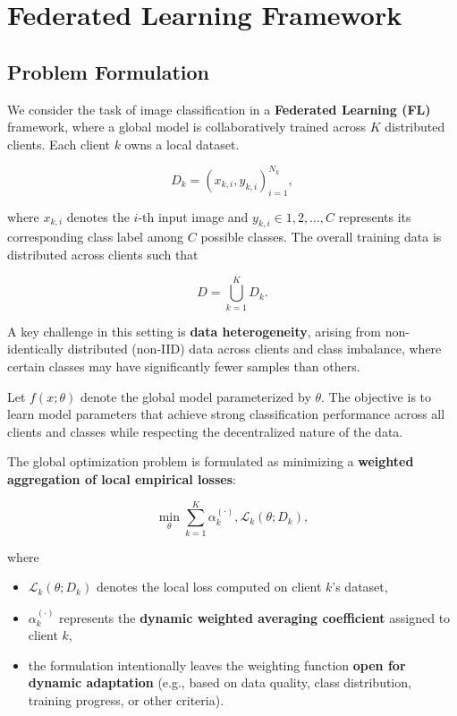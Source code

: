 \documentclass[12pt]{book}
\begin{document}
\chapter{Federated Learning Framework}

\section{Problem Formulation}

We consider the task of image classification in a \textbf{Federated Learning (FL)} framework, where a global model is collaboratively trained across $K$ distributed clients. Each client $k$ owns a local dataset.

\begin{equation}
D_k = {(x_{k,i}, y_{k,i})}_{i=1}^{N_k},
\end{equation}

where $x_{k,i}$ denotes the $i$-th input image and $y_{k,i} \in {1,2,\ldots,C}$ represents its corresponding class label among $C$ possible classes. The overall training data is distributed across clients such that

\begin{equation}
D = \bigcup_{k=1}^{K} D_k .
\end{equation}

A key challenge in this setting is \textbf{data heterogeneity}, arising from non-identically distributed (non-IID) data across clients and class imbalance, where certain classes may have significantly fewer samples than others.

Let $f(x;\theta)$ denote the global model parameterized by $\theta$. The objective is to learn model parameters that achieve strong classification performance across all clients and classes while respecting the decentralized nature of the data.

The global optimization problem is formulated as minimizing a \textbf{weighted aggregation of local empirical losses}:

\begin{equation}
\min_{\theta} \sum_{k=1}^{K} \alpha_k^{(\cdot)} , \mathcal{L}_k(\theta; D_k),
\end{equation}

where

\begin{itemize}
\item $\mathcal{L}_k(\theta; D_k)$ denotes the local loss computed on client $k$'s dataset,
\item $\alpha_k^{(\cdot)}$ represents the \textbf{dynamic weighted averaging coefficient} assigned to client $k$,
\item the formulation intentionally leaves the weighting function \textbf{open for dynamic adaptation} (e.g., based on data quality, class distribution, training progress, or other criteria).
\end{itemize}
\end{document}
